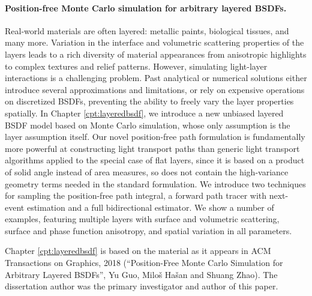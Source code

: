\paragraph{Position-free Monte Carlo simulation for arbitrary layered BSDFs.} 
Real-world materials are often layered: metallic paints, biological tissues, and many more. Variation in the interface and volumetric scattering properties of the layers leads to a rich diversity of material appearances from anisotropic highlights to complex textures and relief patterns. However, simulating light-layer interactions is a challenging problem. Past analytical or numerical solutions either introduce several approximations and limitations, or rely on expensive operations on discretized BSDFs, preventing the ability to freely vary the layer properties spatially. 
In Chapter \ref{cpt:layeredbsdf}, we introduce a new unbiased layered BSDF model based on Monte Carlo simulation, whose only assumption is the layer assumption itself. Our novel position-free path formulation is fundamentally more powerful at constructing light transport paths than generic light transport algorithms applied to the special case of flat layers, since it is based on a product of solid angle instead of area measures, so does not contain the high-variance geometry terms needed in the standard formulation. We introduce two techniques for sampling the position-free path integral, a forward path tracer with next-event estimation and a full bidirectional estimator. We show a number of examples, featuring multiple layers with surface and volumetric scattering, surface and phase function anisotropy, and spatial variation in all parameters.

Chapter \ref{cpt:layeredbsdf} is based on the material as it appears in ACM Transactions on Graphics, 2018
(“Position-Free Monte Carlo Simulation for Arbitrary Layered BSDFs”, Yu Guo, Milo\v{s} Ha\v{s}an and Shuang Zhao). The dissertation author was the primary investigator and author of this paper.

